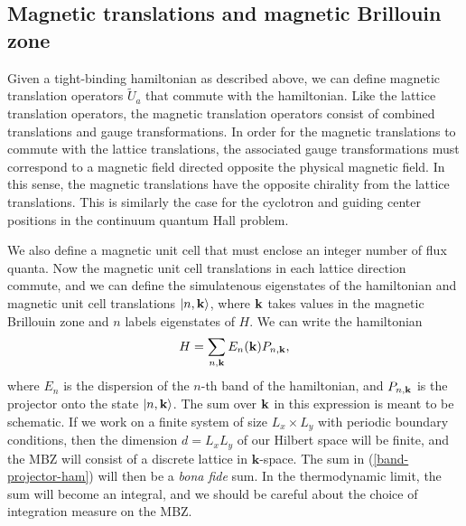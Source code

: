\documentclass[aps,prb,twocolumn,letterpaper,twoside,nobalancelastpage,groupedaddress,amsmath,amssymb,floatfix,citeautoscript]{revtex4-1}
\begin{document}
\subsection{Magnetic translations and magnetic Brillouin zone}
Given a tight-binding hamiltonian as described above, we can define magnetic translation operators $\widetilde{U}_a$ that commute with the hamiltonian.\cite{Zak:1964er,FradkinBook,Kol:1993hs} Like the lattice translation operators, the magnetic translation operators consist of combined translations and gauge transformations. In order for the magnetic translations to commute with the lattice translations, the associated gauge transformations must correspond to a magnetic field directed opposite the physical magnetic field. In this sense, the magnetic translations have the opposite chirality from the lattice translations. This is similarly the case for the cyclotron and guiding center positions in the continuum quantum Hall problem\cite{YoshiokaBook,Read1998}.

We also define a magnetic unit cell that must enclose an integer number of flux quanta. Now the magnetic unit cell translations in each lattice direction commute, and we can define the simulatenous eigenstates of the hamiltonian and magnetic unit cell translations $\ket{n,{\bf k}}$, where ${\bf k}$ takes values in the magnetic Brillouin zone and $n$ labels eigenstates of $H$. We can write the hamiltonian 
\begin{align}
\label{band-projector-ham}
H = \sum_{n,\mathbf{k}} E_{n}({\bf k}) P_{n,{\bf k}},
\end{align}
where $E_n$ is the dispersion of the $n$-th band of the hamiltonian, and $P_{n,{\bf k}}$ is the projector onto the state $\ket{n,{\bf k}}$. The sum over ${\bf k}$ in this expression is meant to be schematic. If we work on a finite system of size $L_x \times L_y$ with periodic boundary conditions, then the dimension $d = L_x L_y$ of our Hilbert space will be finite, and the MBZ will consist of a discrete lattice in $\mathbf{k}$-space. The sum in (\ref{band-projector-ham}) will then be a \textit{bona fide} sum. In the thermodynamic limit, the sum will become an integral, and we should be careful about the choice of integration measure on the MBZ.
\end{document}
